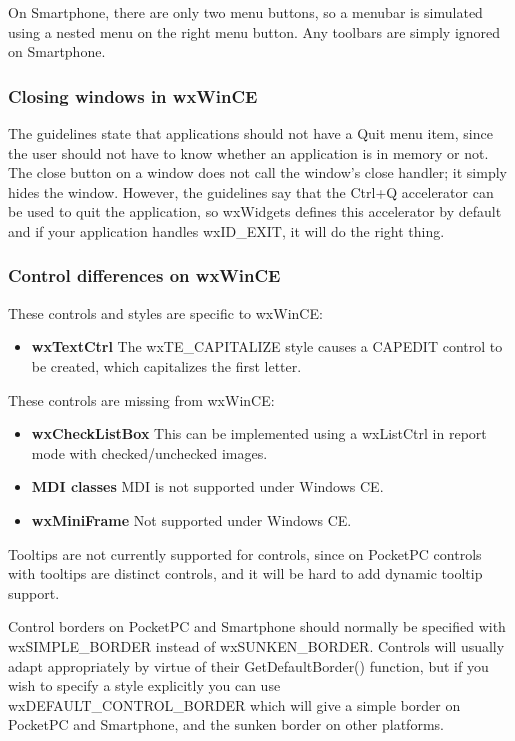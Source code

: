 On Smartphone, there are only two menu buttons, so a menubar is simulated
using a nested menu on the right menu button. Any toolbars are simply ignored on
Smartphone.

\subsubsection{Closing windows in wxWinCE}

The guidelines state that applications should not have a Quit menu item,
since the user should not have to know whether an application is in memory
or not. The close button on a window does not call the window's
close handler; it simply hides the window. However, the guidelines say that
the Ctrl+Q accelerator can be used to quit the application, so wxWidgets
defines this accelerator by default and if your application handles
wxID\_EXIT, it will do the right thing.

\subsubsection{Control differences on wxWinCE}

These controls and styles are specific to wxWinCE:

\itemsep=0pt
\begin{itemize}
\item {\bf wxTextCtrl} The wxTE\_CAPITALIZE style causes a CAPEDIT control to
be created, which capitalizes the first letter.
\end{itemize}

These controls are missing from wxWinCE:

\itemsep=0pt
\begin{itemize}
\item {\bf wxCheckListBox} This can be implemented using a wxListCtrl in report mode
with checked/unchecked images.
\item {\bf MDI classes} MDI is not supported under Windows CE.
\item {\bf wxMiniFrame} Not supported under Windows CE.
\end{itemize}

Tooltips are not currently supported for controls, since on PocketPC controls with
tooltips are distinct controls, and it will be hard to add dynamic
tooltip support.

Control borders on PocketPC and Smartphone should normally be specified with
wxSIMPLE\_BORDER instead of wxSUNKEN\_BORDER. Controls will usually adapt
appropriately by virtue of their GetDefaultBorder() function, but if you
wish to specify a style explicitly you can use wxDEFAULT\_CONTROL\_BORDER
which will give a simple border on PocketPC and Smartphone, and the sunken border on
other platforms.

